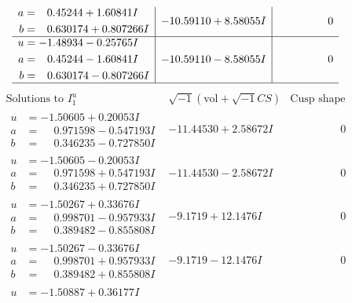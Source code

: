 \documentclass[1p]{elsarticle_modified}
\theoremstyle{definition}
\newcommand{\I}{\sqrt{-1}}
\begin{document}
$$\begin{array}{c|c|c}
\begin{aligned}
a &= \phantom{-}0.45244 + 1.60841 I \\
b &= \phantom{-}0.630174 + 0.807266 I\end{aligned}
 & -10.59110 + 8.58055 I & \phantom{-0.000000 } 0 \\ \hline\begin{aligned}
u &= -1.48934 - 0.25765 I \\
a &= \phantom{-}0.45244 - 1.60841 I \\
b &= \phantom{-}0.630174 - 0.807266 I\end{aligned}
 & -10.59110 - 8.58055 I & \phantom{-0.000000 } 0\\
 \hline 
 \end{array}$$\newpage$$\begin{array}{c|c|c}  
\text{Solutions to }I^u_{1}& \I (\text{vol} + \sqrt{-1}CS) & \text{Cusp shape}\\
 \hline 
\begin{aligned}
u &= -1.50605 + 0.20053 I \\
a &= \phantom{-}0.971598 - 0.547193 I \\
b &= \phantom{-}0.346235 - 0.727850 I\end{aligned}
 & -11.44530 + 2.58672 I & \phantom{-0.000000 } 0 \\ \hline\begin{aligned}
u &= -1.50605 - 0.20053 I \\
a &= \phantom{-}0.971598 + 0.547193 I \\
b &= \phantom{-}0.346235 + 0.727850 I\end{aligned}
 & -11.44530 - 2.58672 I & \phantom{-0.000000 } 0 \\ \hline\begin{aligned}
u &= -1.50267 + 0.33676 I \\
a &= \phantom{-}0.998701 - 0.957933 I \\
b &= \phantom{-}0.389482 - 0.855808 I\end{aligned}
 & -9.1719 + 12.1476 I & \phantom{-0.000000 } 0 \\ \hline\begin{aligned}
u &= -1.50267 - 0.33676 I \\
a &= \phantom{-}0.998701 + 0.957933 I \\
b &= \phantom{-}0.389482 + 0.855808 I\end{aligned}
 & -9.1719 - 12.1476 I & \phantom{-0.000000 } 0 \\ \hline\begin{aligned}
u &= -1.50887 + 0.36177 I \\

\end{aligned}
\end{array}$$
\end{document}
